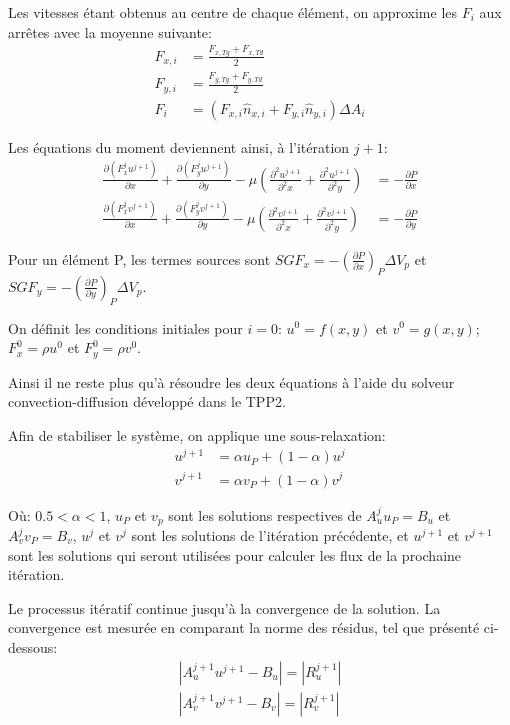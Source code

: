 \documentclass[12pt]{article}
\begin{document}
Les vitesses étant obtenus au centre de chaque élément, on approxime les $F_i$ aux arrêtes avec la moyenne suivante:
\begin{align}
F_{x,i} &= \frac{F_{x,Tg} + F_{x,Td}}{2} \\
F_{y,i} &= \frac{F_{y,Tg} + F_{y,Td}}{2} \\
F_i &= (F_{x,i} \hat{n}_{x,i} + F_{y,i} \hat{n}_{y,i}) \Delta A_i
\end{align}

Les équations du moment deviennent ainsi, à l'itération $j+1$:
\begin{align}
\frac{\partial {(F_x^j u^{j+1})}}{\partial x} + \frac{\partial {(F_y^j u^{j+1})}}{\partial y} - \mu \left(\frac{\partial^2 u^{j+1}}{\partial^2 x} + \frac{\partial^2 u^{j+1}}{\partial^2 y} \right) &= - \frac{\partial P}{\partial x} \\
\frac{\partial {(F_x^j v^{j+1})}}{\partial x} + \frac{\partial {(F_y^j v^{j+1})}}{\partial y} - \mu \left(\frac{\partial^2 v^{j+1}}{\partial^2 x} + \frac{\partial^2 v^{j+1}}{\partial^2 y} \right) &= - \frac{\partial P}{\partial y}
\end{align}

Pour un élément P, les termes sources sont $SGF_x = - \left(\frac{\partial P}{\partial x}\right)_P \Delta V_p$ et $SGF_y = - \left(\frac{\partial P}{\partial y}\right)_P \Delta V_p$.

On définit les conditions initiales pour $i=0$: $u^0=f(x,y)$ et $v^0=g(x,y)$; $F_x^0 = \rho u^0$ et $F_y^0 = \rho v^0$.

Ainsi il ne reste plus qu'à résoudre les deux équations à l'aide du solveur convection-diffusion développé dans le TPP2.

Afin de stabiliser le système, on applique une sous-relaxation:
\begin{align}
u^{j+1} &= \alpha u_P + (1-\alpha)u^j \\
v^{j+1} &= \alpha v_P + (1-\alpha)v^j
\end{align}

Où: 
$0.5<\alpha<1$, $u_P$ et $v_p$ sont les solutions respectives de $A_u^j u_P = B_u$ et $A_v^j v_P = B_v$, $u^j$ et $v^j$ sont les solutions de l'itération précédente, et $u^{j+1}$ et $v^{j+1}$ sont les solutions qui seront utilisées pour calculer les flux de la prochaine itération.

Le processus itératif continue jusqu'à la convergence de la solution. La convergence est mesurée en comparant la norme des résidus, tel que présenté ci-dessous:
\begin{align}
|A_u^{j+1} u^{j+1} - B_u| = |R_u^{j+1}| \\
|A_v^{j+1} v^{j+1} - B_v| = |R_v^{j+1}|
\end{align}
\end{document}
